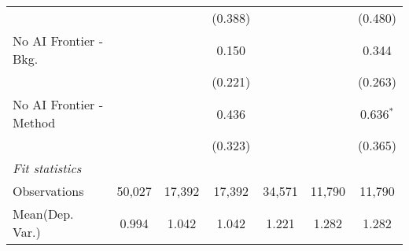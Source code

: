 \begin{tabular}{lcccccc}
                           &              &              & (0.388)     &         &         & (0.480)\\   
   No AI Frontier - Bkg.   &              &              & 0.150       &         &         & 0.344\\   
                           &              &              & (0.221)     &         &         & (0.263)\\   
   No AI Frontier - Method &              &              & 0.436       &         &         & 0.636$^{*}$\\   
                           &              &              & (0.323)     &         &         & (0.365)\\   
   \midrule
   \emph{Fit statistics}\\
   Observations            & 50,027       & 17,392       & 17,392      & 34,571  & 11,790  & 11,790\\  
Mean(Dep. Var.) & 0.994 & 1.042 & 1.042 & 1.221 & 1.282 & 1.282 \\
   

\end{tabular}

